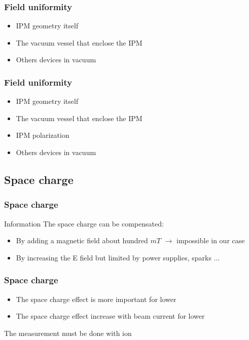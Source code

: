 \begin{frame}
  \frametitle{Field uniformity}
  \begin{itemize}
    \item IPM geometry itself
    \item The vacuum vessel that enclose the IPM
    \item Others devices in vacuum
  \end{itemize}
\end{frame}

\begin{frame}
  \frametitle{Field uniformity}
  \begin{itemize}
    \item IPM geometry itself
    \item The vacuum vessel that enclose the IPM
    \item IPM polarization
    \item Others devices in vacuum
  \end{itemize}
\end{frame}

\subsection{Space charge}
\begin{frame}
  \frametitle{Space charge}
  \begin{block}{Information}
    The space charge can be compensated:
    \begin{itemize}
      \item By adding a magnetic field about hundred $mT$ $\rightarrow$ impossible in our case
      \item By increasing the E field but limited by power supplies, sparks ...
    \end{itemize}
  \end{block}
\end{frame}

\begin{frame}
  \frametitle{Space charge}
  \begin{block}{}
    \begin{itemize}
      \item The space charge effect is more important for lower
      \item The space charge effect increase with beam current for lower
    \end{itemize}
  \end{block}

  \begin{alertblock}
    The measurement must be done with ion
  \end{alertblock}
\end{frame}


